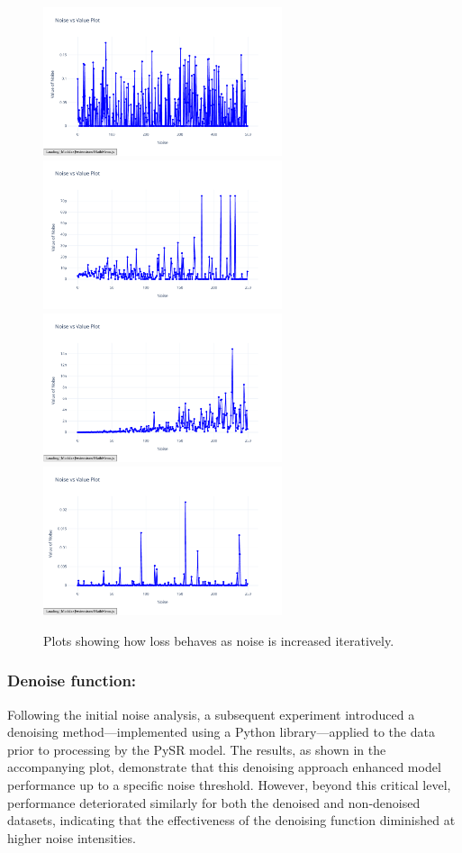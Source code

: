 \documentclass{article}
\begin{document}
\begin{figure}[H]
    \centering
    \includegraphics[width=7cm]{noise_conservation_random_i}
    \includegraphics[width=7cm]{noise_Newtons_First_Law_random_i}
    \includegraphics[width=7cm]{noise_Newtons_Third_Law_random_i}
    \includegraphics[width=7cm]{noise_Simple_Harmonic_Motion_random_i}
    \caption{Plots showing how loss behaves as noise is increased iteratively.}
    \label{fig:noise_iterative_plots}
\end{figure}


\subsubsection{Denoise function: }

Following the initial noise analysis, a subsequent experiment introduced a denoising method—implemented using a Python library—applied to the data prior to processing by the PySR model. The results, as shown in the accompanying plot, demonstrate that this denoising approach enhanced model performance up to a specific noise threshold. However, beyond this critical level, performance deteriorated similarly for both the denoised and non-denoised datasets, indicating that the effectiveness of the denoising function diminished at higher noise intensities.\cite{Wood2022} \\
\end{document}
